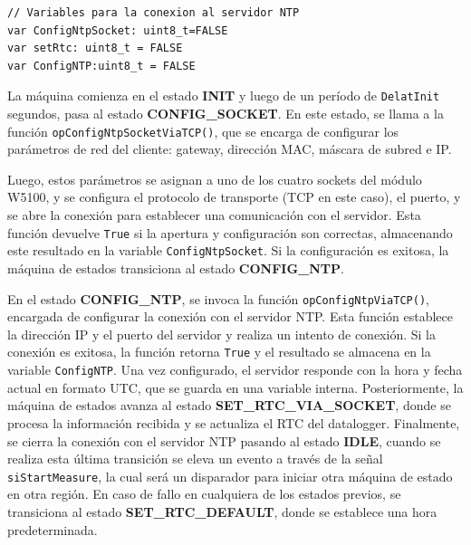 \begin{lstlisting}[style=yakindustyle, caption={Declaración de variables booleanas para validar la conexion con el servidor NTP.}, label=cdg:serRTC]
// Variables para la conexion al servidor NTP
var ConfigNtpSocket: uint8_t=FALSE
var setRtc: uint8_t = FALSE
var ConfigNTP:uint8_t = FALSE
\end{lstlisting}

La máquina comienza en el estado \textbf{INIT} y luego de un período de \texttt{DelatInit} segundos, pasa al estado \textbf{CONFIG\_SOCKET}. En este estado, se llama a la función \texttt{opConfigNtpSocketViaTCP()}, que se encarga de configurar los parámetros de red del cliente: gateway, dirección MAC, máscara de subred e IP. 

Luego, estos parámetros se asignan a uno de los cuatro sockets del módulo W5100, y se configura el protocolo de transporte (TCP en este caso), el puerto, y se abre la conexión para establecer una comunicación con el servidor. Esta función devuelve \texttt{True} si la apertura y configuración son correctas, almacenando este resultado en la variable \texttt{ConfigNtpSocket}. Si la configuración es exitosa, la máquina de estados transiciona al estado \textbf{CONFIG\_NTP}.

En el estado \textbf{CONFIG\_NTP}, se invoca la función \texttt{opConfigNtpViaTCP()}, encargada de configurar la conexión con el servidor NTP. Esta función establece la dirección IP y el puerto del servidor y realiza un intento de conexión. Si la conexión es exitosa, la función retorna \texttt{True} y el resultado se almacena en la variable \texttt{ConfigNTP}. Una vez configurado, el servidor responde con la hora y fecha actual en formato UTC, que se guarda en una variable interna. Posteriormente, la máquina de estados avanza al estado \textbf{SET\_RTC\_VIA\_SOCKET}, donde se procesa la información recibida y se actualiza el RTC del datalogger. Finalmente, se cierra la conexión con el servidor NTP pasando al estado \textbf{IDLE}, cuando se realiza esta última transición se eleva un evento a través de la señal \texttt{siStartMeasure}, la cual será un disparador para iniciar otra máquina de estado en otra región. En caso de fallo en cualquiera de los estados previos, se transiciona al estado \textbf{SET\_RTC\_DEFAULT}, donde se establece una hora predeterminada.

